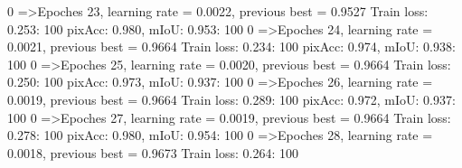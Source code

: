   0%
=>Epoches 23, learning rate = 0.0022,                 previous best = 0.9527
Train loss: 0.253: 100%
pixAcc: 0.980, mIoU: 0.953: 100%
  0%
=>Epoches 24, learning rate = 0.0021,                 previous best = 0.9664
Train loss: 0.234: 100%
pixAcc: 0.974, mIoU: 0.938: 100%
  0%
=>Epoches 25, learning rate = 0.0020,                 previous best = 0.9664
Train loss: 0.250: 100%
pixAcc: 0.973, mIoU: 0.937: 100%
  0%
=>Epoches 26, learning rate = 0.0019,                 previous best = 0.9664
Train loss: 0.289: 100%
pixAcc: 0.972, mIoU: 0.937: 100%
  0%
=>Epoches 27, learning rate = 0.0019,                 previous best = 0.9664
Train loss: 0.278: 100%
pixAcc: 0.980, mIoU: 0.954: 100%
  0%
=>Epoches 28, learning rate = 0.0018,                 previous best = 0.9673
Train loss: 0.264: 100%
